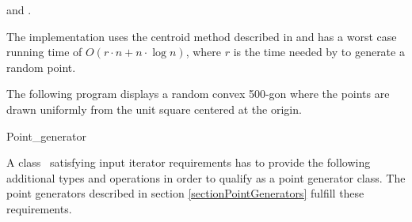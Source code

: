 \ccSeeAlso {} and
.

\ccImplementation The implementation uses the centroid method
described in \cite{s-zkm-96} and has a worst case running time of $O(r
\cdot n + n \cdot \log n)$, where $r$ is the time needed by 
to generate a random point.

\ccExample

The following program displays a random convex 500-gon where the
points are drawn uniformly from the unit square centered at the
origin.


\ccTagDefaults

\begin{ccClass}{Point_generator}
     \ccTagFullDeclarations
    
    \label{point_generator_req}
    
    \ccDefinition A class \ccClassName\ satisfying input iterator
    requirements has to provide the following additional types and
    operations in order to qualify as a point generator class. The
    point generators described in section \ref{sectionPointGenerators}
    fulfill these requirements.

    \ccTypes\lcTex{\ccIndexClassTypes}
    
    

    \ccOperations
    \lcTex{\begin{ccIndexMemberFunctions}}
    
    \lcTex{\end{ccIndexMemberFunctions}}
    
\end{ccClass}

